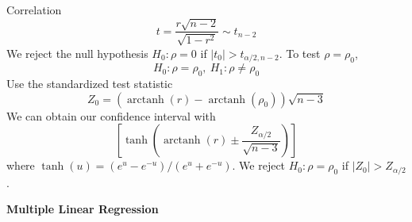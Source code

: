 \documentclass{article}
\DeclareMathOperator{\atanh}{arctanh}
\begin{document}
\begin{multicols*}{3}
\begin{blackbox}{Correlation}
        \[t = \frac{r\sqrt{n-2}}{\sqrt{1-r^2}} \sim t_{n-2}\]
        We reject the null hypothesis $H_0: \rho = 0$ if $|t_0| > t_{\alpha/2, n-2}$. To test $\rho = \rho_0$, \\[-2ex]
        \[H_0: \rho = \rho_0, \ H_1: \rho \neq \rho_0\]
        Use the standardized test statistic\\[-2.3ex]
        \[Z_0 = (\atanh(r) - \atanh(\rho_0))\sqrt{n-3}\]
        We can obtain our confidence interval with 
        \[\left[\tanh\left(\atanh(r) \pm \frac{Z_{\alpha/2}}{\sqrt{n-3}}\right)\right]\]
        where $\tanh(u) = (e^u-e^{-u})/(e^u + e^{-u})$. We reject $H_0: \rho = \rho_0$ if $|Z_0| > Z_{\alpha/2}$.
    \end{blackbox}

\end{multicols*}

\begin{center}{\large{\textbf{Multiple Linear Regression}}}\\
\end{center}
\end{document}
